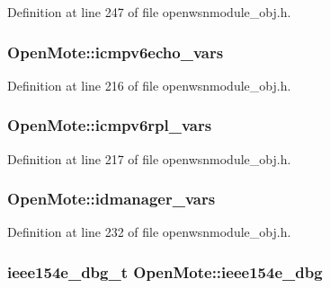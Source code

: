 Definition at line 247 of file openwsnmodule\+\_\+obj.\+h.

\subsubsection[{\texorpdfstring{icmpv6echo\+\_\+vars}{icmpv6echo_vars}}]{ Open\+Mote\+::icmpv6echo\+\_\+vars}\hypertarget{struct_open_mote_a74d216986865202f5926575d3242d295}{}\label{struct_open_mote_a74d216986865202f5926575d3242d295}


Definition at line 216 of file openwsnmodule\+\_\+obj.\+h.

\subsubsection[{\texorpdfstring{icmpv6rpl\+\_\+vars}{icmpv6rpl_vars}}]{ Open\+Mote\+::icmpv6rpl\+\_\+vars}\hypertarget{struct_open_mote_a01fe7b57f57b11c5fa7023c87949d81d}{}\label{struct_open_mote_a01fe7b57f57b11c5fa7023c87949d81d}


Definition at line 217 of file openwsnmodule\+\_\+obj.\+h.

\subsubsection[{\texorpdfstring{idmanager\+\_\+vars}{idmanager_vars}}]{ Open\+Mote\+::idmanager\+\_\+vars}\hypertarget{struct_open_mote_aee86d15881d8b0681a1f0c292536888c}{}\label{struct_open_mote_aee86d15881d8b0681a1f0c292536888c}


Definition at line 232 of file openwsnmodule\+\_\+obj.\+h.

\subsubsection[{\texorpdfstring{ieee154e\+\_\+dbg}{ieee154e_dbg}}]{\setlength{\rightskip}{0pt plus 5cm}ieee154e\+\_\+dbg\+\_\+t Open\+Mote\+::ieee154e\+\_\+dbg}\hypertarget{struct_open_mote_a31e50da96e526495ff1c49873ae60ea9}{}\label{struct_open_mote_a31e50da96e526495ff1c49873ae60ea9}


